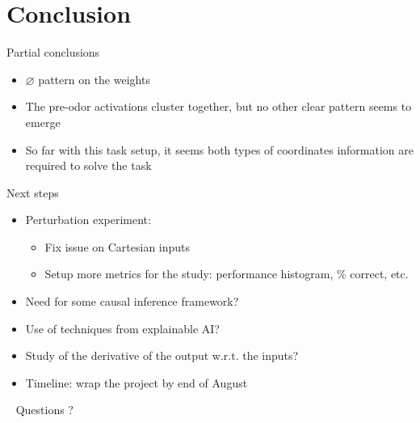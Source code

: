 \documentclass[bigger]{beamer}
\begin{document}
\section{Conclusion}
\label{sec:org7945d9f}
\begin{frame}[<+->][label={sec:orge5279fb}]{Partial conclusions}
\begin{itemize}
\item \(\varnothing\) pattern on the weights
\item The \alert{pre-odor activations} cluster together, but no other clear pattern seems to emerge
\item So far with this task setup, it seems \alert{both types of coordinates information are required} to solve the task
\end{itemize}
\end{frame}
\begin{frame}[<+->][label={sec:org196d5ec}]{Next steps}
\begin{itemize}
\item Perturbation experiment:
\begin{itemize}
\item Fix issue on Cartesian inputs
\item Setup more metrics for the study: performance histogram, \% correct, etc.
\end{itemize}
\item Need for some causal inference framework?
\item Use of techniques from explainable AI?
\item Study of the derivative of the output w.r.t. the inputs?
\item \alert{Timeline:} wrap the project by end of August
\end{itemize}
\end{frame}
\begin{frame}[label={sec:org6d5623c},standout]{~}
Questions ?
\end{frame}
\end{document}
